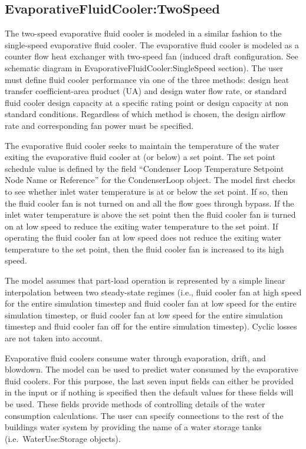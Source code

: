 \subsection{EvaporativeFluidCooler:TwoSpeed}\label{evaporativefluidcoolertwospeed}

The two-speed evaporative fluid cooler is modeled in a similar fashion to the single-speed evaporative fluid cooler. The evaporative fluid cooler is modeled as a counter flow heat exchanger with two-speed fan (induced draft configuration. See schematic diagram in EvaporativeFluidCooler:SingleSpeed section). The user must define fluid cooler performance via one of the three methods: design heat transfer coefficient-area product (UA) and design water flow rate, or standard fluid cooler design capacity at a specific rating point or design capacity at non standard conditions. Regardless of which method is chosen, the design airflow rate and corresponding fan power must be specified.

The evaporative fluid cooler seeks to maintain the temperature of the water exiting the evaporative fluid cooler at (or below) a set point. The set point schedule value is defined by the field ``Condenser Loop Temperature Setpoint Node Name or Reference'' for the CondenserLoop object. The model first checks to see whether inlet water temperature is at or below the set point. If so, then the fluid cooler fan is not turned on and all the flow goes through bypass. If the inlet water temperature is above the set point then the fluid cooler fan is turned on at low speed to reduce the exiting water temperature to the set point. If operating the fluid cooler fan at low speed does not reduce the exiting water temperature to the set point, then the fluid cooler fan is increased to its high speed.

The model assumes that part-load operation is represented by a simple linear interpolation between two steady-state regimes (i.e., fluid cooler fan at high speed for the entire simulation timestep and fluid cooler fan at low speed for the entire simulation timestep, or fluid cooler fan at low speed for the entire simulation timestep and fluid cooler fan off for the entire simulation timestep). Cyclic losses are not taken into account.

Evaporative fluid coolers consume water through evaporation, drift, and blowdown. The model can be used to predict water consumed by the evaporative fluid coolers. For this purpose, the last seven input fields can either be provided in the input or if nothing is specified then the default values for these fields will be used. These fields provide methods of controlling details of the water consumption calculations. The user can specify connections to the rest of the buildings water system by providing the name of a water storage tanks (i.e.~WaterUse:Storage objects).

